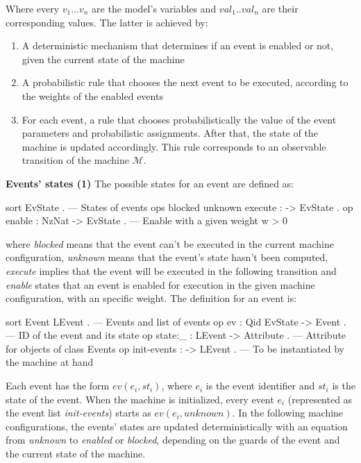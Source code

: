 Where every $v_1 ... v_n$ are the model's variables and $val_1..val_n$ are their corresponding values. The latter is achieved by:

\begin{enumerate}
    \item A deterministic mechanism that determines if an event is enabled or not, given the current state of the machine
    \item A probabilistic rule that chooses the next event to be executed, according to the weights of the enabled events
    \item For each event, a rule that chooses probabilistically the value of the event parameters and probabilistic assignments. After that, the state of the machine is updated accordingly. This rule corresponds to an observable transition of the machine $\mathscr{M}$.
\end{enumerate}
\textbf{Events' states (1)} The possible states for an event are defined as:
\\
\begin{maude}
 sort EvState . --- States of events
 ops blocked unknown execute : -> EvState . 
 op enable : NzNat -> EvState . --- Enable with a given weight w > 0
\end{maude}
where \textit{blocked} means that the event can't be executed in the current machine configuration, \textit{unknown} means that the event's state hasn't been computed, \textit{execute} implies that the event will be executed in the following transition and \textit{enable} states that an event is enabled for execution in the given machine configuration, with an specific weight. The definition for an event is:
\\
\begin{maude}
   sort Event LEvent . --- Events and list of events
   op ev : Qid EvState -> Event . --- ID of the event and its state
   op state:_ : LEvent -> Attribute . --- Attribute for objects of class Events   
   op init-events : -> LEvent . --- To be instantiated by the machine at hand
\end{maude}
Each event has the form $ev(e_i, st_i)$, where $e_i$ is the event identifier and $st_i$ is the state of the event. When the machine is initialized, every event $e_i$ (represented as the event list \textit{init-events}) starts as $ev(e_i, unknown)$. In the following machine configurations, the events' states are updated deterministically with an equation from \textit{unknown} to \textit{enabled} or \textit{blocked}, depending on the guards of the event and the current state of the machine.

